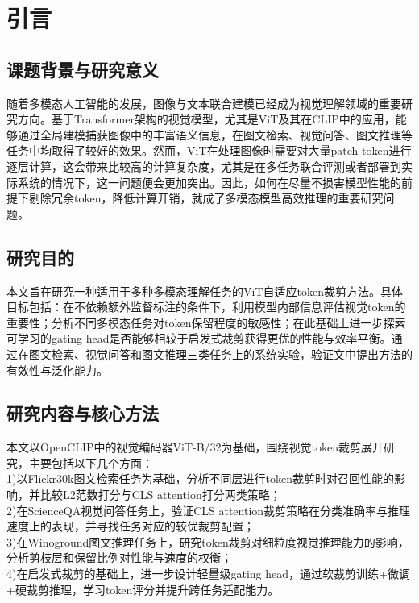 \documentclass{article}
\begin{document}
	
	\section{引言}
		\subsection{课题背景与研究意义}
		{\setlength{\parindent}{2em}\setlength{\baselineskip}{20pt}\selectfont
			随着多模态人工智能的发展，图像与文本联合建模已经成为视觉理解领域的重要研究方向。基于Transformer架构的视觉模型，尤其是ViT及其在CLIP中的应用，能够通过全局建模捕获图像中的丰富语义信息，在图文检索、视觉问答、图文推理等任务中均取得了较好的效果。然而，ViT在处理图像时需要对大量patch token进行逐层计算，这会带来比较高的计算复杂度，尤其是在多任务联合评测或者部署到实际系统的情况下，这一问题便会更加突出。因此，如何在尽量不损害模型性能的前提下剔除冗余token，降低计算开销，就成了多模态模型高效推理的重要研究问题。
		\subsection{研究目的}
		{\setlength{\parindent}{2em}\setlength{\baselineskip}{20pt}\selectfont
			本文旨在研究一种适用于多种多模态理解任务的ViT自适应token裁剪方法。具体目标包括：在不依赖额外监督标注的条件下，利用模型内部信息评估视觉token的重要性；分析不同多模态任务对token保留程度的敏感性；在此基础上进一步探索可学习的gating head是否能够相较于启发式裁剪获得更优的性能与效率平衡。通过在图文检索、视觉问答和图文推理三类任务上的系统实验，验证文中提出方法的有效性与泛化能力。
		\subsection{研究内容与核心方法}
		{\setlength{\baselineskip}{20pt}\selectfont
			\setlength{\parindent}{2em}本文以OpenCLIP中的视觉编码器ViT-B/32为基础，围绕视觉token裁剪展开研究，主要包括以下几个方面：\setlength{\parindent}{0em}
			\\
			1)以Flickr30k图文检索任务为基础，分析不同层进行token裁剪时对召回性能的影响，并比较L2范数打分与CLS attention打分两类策略；\\
			2)在ScienceQA视觉问答任务上，验证CLS attention裁剪策略在分类准确率与推理速度上的表现，并寻找任务对应的较优裁剪配置；\\
			3)在Winoground图文推理任务上，研究token裁剪对细粒度视觉推理能力的影响，分析剪枝层和保留比例对性能与速度的权衡；\\
			4)在启发式裁剪的基础上，进一步设计轻量级gating head，通过软裁剪训练+微调+硬裁剪推理，学习token评分并提升跨任务适配能力。
}}}
\end{document}
